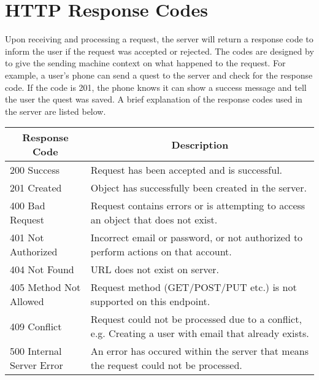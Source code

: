 \chapter{HTTP Response Codes}

Upon receiving and processing a request, the server will return a response code to inform the user if the request was accepted or rejected.
The codes are designed by \cite{rfc7231} to give the sending machine context on what happened to the request.
For example, a user's phone can send a quest to the server and check for the response code.
If the code is 201, the phone knows it can show a success message and tell the user the quest was saved.
A brief explanation of the response codes used in the server are listed below.

\begin{tabularx}{\linewidth}{|p{3cm}|X|}\hline
\multicolumn{1}{|c|}{\textbf{Response Code}} & \multicolumn{1}{c|}{\textbf{Description}}                                                              \\ \hline
200 Success                                  & Request has been accepted and is successful.                                                           \\ \hline
201 Created                                  & Object has successfully been created in the server.                                                    \\ \hline
400 Bad Request                              & Request contains errors or is attempting to access an object that does not exist.                      \\ \hline
401 Not Authorized                           & Incorrect email or password, or not authorized to perform actions on that account.                     \\ \hline
404 Not Found                                & URL does not exist on server.                                                                          \\ \hline
405 Method Not Allowed                       & Request method (GET/POST/PUT etc.) is not supported on this endpoint.                                  \\ \hline
409 Conflict                                 & Request could not be processed due to a conflict, e.g. Creating a user with email that already exists. \\ \hline
500 Internal Server Error                    & An error has occured within the server that means the request could not be processed.                  \\ \hline
\end{tabularx} 